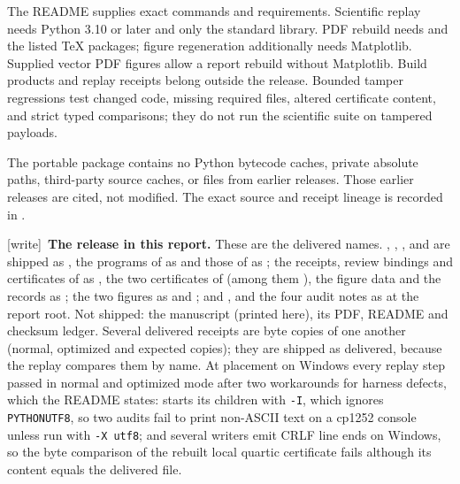 \documentclass[11pt,letterpaper]{article}
\numberwithin{equation}{section}
\theoremstyle{definition}
\theoremstyle{remark}
\newcommand{\wtag}{\textup{[write]}}
\newcommand{\file}[1]{\texttt{\detokenize{#1}}}
\begin{document}
The README supplies exact commands and requirements. Scientific replay needs Python 3.10 or later and only the standard library. PDF rebuild needs \file{pdflatex} and the listed TeX packages; figure regeneration additionally needs Matplotlib. Supplied vector PDF figures allow a report rebuild without Matplotlib. Build products and replay receipts belong outside the release. Bounded tamper regressions test changed code, missing required files, altered certificate content, and strict typed comparisons; they do not run the scientific suite on tampered payloads.

The portable package contains no Python bytecode caches, private absolute paths, third-party source caches, or files from earlier releases. Those earlier releases are cited, not modified. The exact source and receipt lineage is recorded in \file{verification/source-lineage.json}.

\wtag\ \textbf{The release in this report.} These are the delivered names. , , ,  and  are shipped as , the programs of  as  and those of  as ; the receipts, review bindings and certificates of  as , the two certificates of  (among them ), the figure data and the  records as ; the two figures as  and ; and ,  and the four audit notes as  at the report root. Not shipped: the manuscript (printed here), its PDF, README and checksum ledger. Several delivered receipts are byte copies of one another (normal, optimized and expected copies); they are shipped as delivered, because the replay compares them by name. At placement on Windows every replay step passed in normal and optimized mode after two workarounds for harness defects, which the README states:  starts its children with \texttt{-I}, which ignores \texttt{PYTHONUTF8}, so two audits fail to print non-ASCII text on a cp1252 console unless run with \texttt{-X utf8}; and several writers emit CRLF line ends on Windows, so the byte comparison of the rebuilt local quartic certificate fails although its content equals the delivered file.
\end{document}
